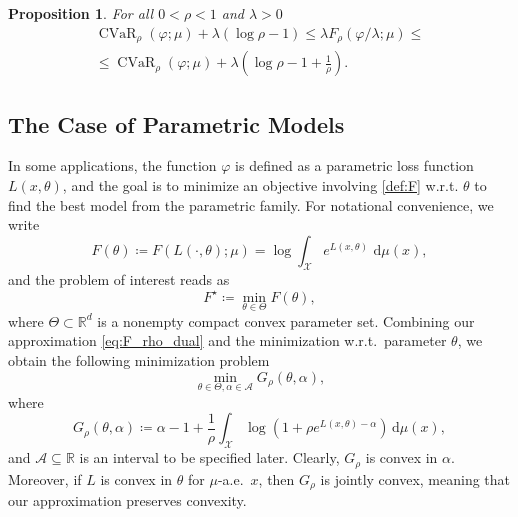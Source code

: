 \documentclass{article}
\newcommand{\dd}{\,\mathrm{d}}
\newcommand{\R}{\mathbb{R}}
\newcommand*{\eqset}{\coloneqq}
\def\cX{\mathcal{X}}
\theoremstyle{plain}
\newtheorem{proposition}[theorem]{Proposition}
\theoremstyle{definition}
\theoremstyle{remark}
\begin{document}
\begin{proposition}\label{prop:cvar}
    For all $0 < \rho < 1$ and $\lambda > 0$  
    \begin{align}
        \operatorname{CVaR}_\rho(\varphi; \mu) + \lambda (\log \rho - 1) 
        \le \lambda F_\rho(\varphi / \lambda ; \mu) \le \nonumber
        \\\le \operatorname{CVaR}_\rho(\varphi; \mu) + \lambda \left(\log \rho - 1 + \frac{1}{\rho}\right) . \label{eq:lower_cvar}
    \end{align}
\end{proposition}


\subsection{The Case of Parametric Models}
In some applications, the function $\varphi$ is defined as a parametric loss function $L(x, \theta)$, and the goal is to minimize an objective involving \eqref{def:F} w.r.t. $\theta$ to find the best model from the parametric family. 
For notational convenience, we write
\[
    F(\theta)
    \eqset
    F(L(\cdot,\theta);\mu)
    =
    \log\int_{\cX} e^{L(x,\theta)}\,\dd\mu(x),
\]
and the problem of interest reads as
\[
    F^\star\eqset \min_{\theta\in\Theta}F(\theta),
\]
where $\Theta \subset \R^d$ is a nonempty compact convex parameter set.
Combining our approximation \eqref{eq:F_rho_dual} and the minimization w.r.t.\ parameter $\theta$, we obtain the following minimization problem
\begin{equation}\label{eq:parametric_problem}
    \min_{\theta \in \Theta, \alpha \in \mathcal{A}} G_\rho(\theta, \alpha),
\end{equation}
where
\[
    G_\rho(\theta, \alpha) \eqset \alpha - 1 + \frac{1}{\rho} \int_{\cX} \log\left(1 + \rho e^{L(x, \theta) - \alpha}\right) \dd \mu(x),
\]
and \(\mathcal{A} \subseteq \R\) is an interval to be specified later. 
Clearly, $G_\rho$ is convex in $\alpha$. 
Moreover, if $L$ is convex in $\theta$ for $\mu$-a.e.\ $x$, then $G_\rho$ is jointly convex, meaning that our approximation preserves convexity.
\end{document}
